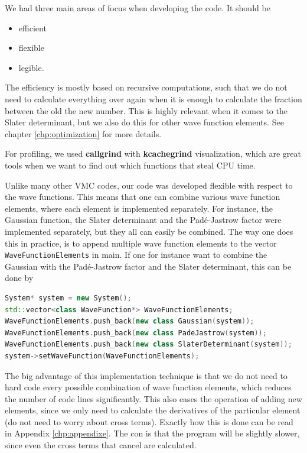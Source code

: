 We had three main areas of focus when developing the code. It should be
\begin{itemize}
	\itemsep-0.3em
	\item efficient
	\item flexible
	\item legible.
\end{itemize}

The efficiency is mostly based on recursive computations, such that we do not need to calculate everything over again when it is enough to calculate the fraction between the old the new number. This is highly relevant when it comes to the Slater determinant, but we also do this for other wave function elements. See chapter \eqref{chp:optimization} for more details. 

For profiling, we used \textbf{callgrind} with \textbf{kcachegrind} visualization, which are great tools when we want to find out which functions that steal CPU time. 

Unlike many other VMC codes, our code was developed flexible with respect to the wave functions. This means that one can combine various wave function elements, where each element is implemented separately. For instance, the Gaussian function, the Slater determinant and the Padé-Jastrow factor were implemented separately, but they all can easily be combined. The way one does this in practice, is to append multiple wave function elements to the vector \texttt{WaveFunctionElements} in main. If one for instance want to combine the Gaussian with the Padé-Jastrow factor and the Slater determinant, this can be done by

\lstset{basicstyle=\scriptsize}
\begin{lstlisting}[language=c++,caption={\texttt{main.cpp}}]
System* system = new System();
std::vector<class WaveFunction*> WaveFunctionElements;
WaveFunctionElements.push_back(new class Gaussian(system));
WaveFunctionElements.push_back(new class PadeJastrow(system));
WaveFunctionElements.push_back(new class SlaterDeterminant(system));
system->setWaveFunction(WaveFunctionElements);
\end{lstlisting}

The big advantage of this implementation technique is that we do not need to hard code every possible combination of wave function elements, which reduces the number of code lines significantly. This also eases the operation of adding new elements, since we only need to calculate the derivatives of the particular element (do not need to worry about cross terms). Exactly how this is done can be read in Appendix \ref{chp:appendixe}. The con is that the program will be slightly slower, since even the cross terms that cancel are calculated.


